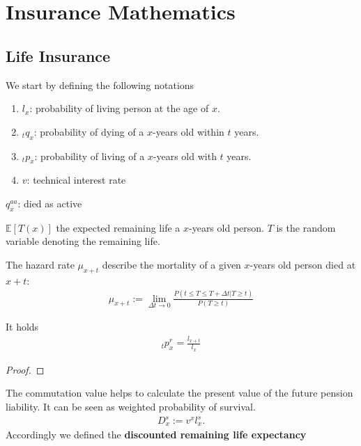 \chapter[Insurance]{Insurance Mathematics}
\section{Life Insurance}
We start by defining the following notations
\begin{enumerate}
	\item $l_x$: probability of living person at the age of $x$.
	\item ${}_t q_x$: probability of dying of a $x$-years old within $t$ years.
	\item ${}_t p_x$: probability of living of a $x$-years old with $t$ years. 
	\item $v$: technical interest rate
\end{enumerate}

$q^{aa}_x$: died as active

\begin{definition}
	$\mathbb{E}[T(x)]$ the expected remaining life a $x$-years old person. $T$ is the random variable denoting the remaining life. 
\end{definition}

\begin{definition}
	The hazard rate $\mu_{x + t}$ describe the mortality of a given $x$-years old person died at $x + t$:
	\begin{align*}
		\mu_{x + t}:= \lim_{\Delta t \rightarrow 0} \frac{P(t \le T \le T + \Delta t|T \ge t) }{P(T \ge t) }
	\end{align*}
\end{definition}

\begin{lemma}
It holds
\begin{align*}
	{}_tp_x^r = \frac{l_{x + t}}{l_x}
\end{align*}
\end{lemma}
\begin{proof}
\end{proof}

\begin{definition}
The commutation value helps to calculate the present value of the future pension liability. It can be seen as weighted probability of survival.
\begin{align*}
	D_x^s := v^x l_x^s.
\end{align*}
Accordingly we defined the \textbf{discounted remaining life expectancy}
\end{definition}


